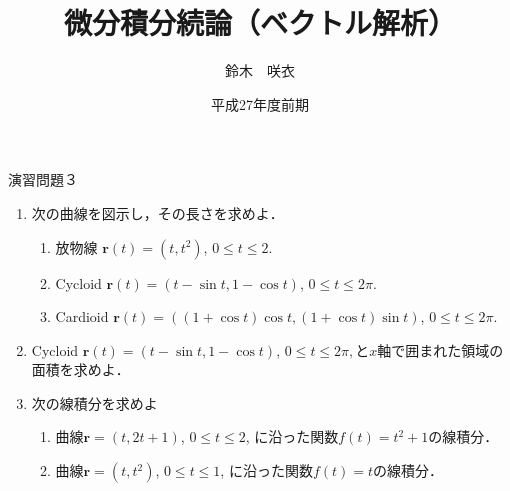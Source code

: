 \documentclass{jarticle}
\begin{document}
\title{微分積分続論（ベクトル解析）} 
\author{鈴木　咲衣}
\date{平成27年度前期}
\maketitle

\begin{center} {\Large 演習問題３ } \end{center}

\begin{enumerate}
\item 次の曲線を図示し，その長さを求めよ．
\begin{enumerate}
\item 放物線 $\bm r(t)=(t,t^{2})$, $0\leq t\leq 2.$
\item Cycloid  $\bm r(t)=(t-\sin t,1-\cos t)$, $0\leq t\leq 2\pi.$
\item Cardioid $\bm r(t)=((1+\cos t)\cos t, (1+\cos t)\sin t)$, $0\leq t\leq 2\pi .$
\end{enumerate}
\item Cycloid  $\bm r(t)=(t-\sin t,1-\cos t)$, $0\leq t\leq 2\pi,$と$x$軸で囲まれた領域の面積を求めよ．


\item 次の線積分を求めよ
\begin{enumerate}
\item 曲線$\bm r=(t,2t+1)$, $0\leq t\leq 2$, に沿った関数$f(t)=t^{2}+1$の線積分．
\item 曲線$\bm r=(t,t^{2})$, $0\leq t\leq 1$, に沿った関数$f(t)=t$の線積分．
\end{enumerate}

\end{enumerate}

\newpage
\end{document}
